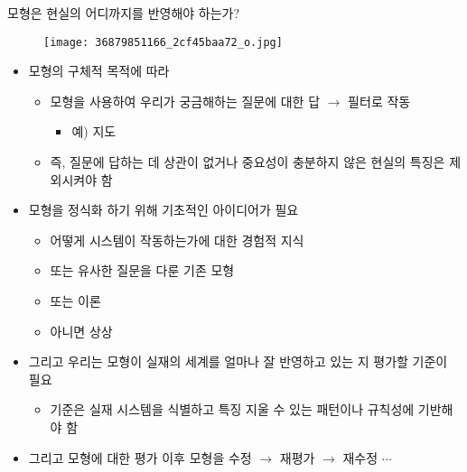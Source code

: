 \documentclass[hyperref={unicode}]{beamer}
\begin{document}
\begin{frame}{모형은 현실의 어디까지를 반영해야 하는가?}
	\begin{figure}[ht]
		\texttt{[image: 36879851166\_2cf45baa72\_o.jpg]}
		\label{fig:model}
	\end{figure}
\end{frame}

\begin{frame}
\begin{itemize}
\item 모형의 구체적 목적에 따라
	\begin{itemize}
	\item 모형을 사용하여 우리가 궁금해하는 질문에 대한 답 $\rightarrow$ 필터로 작동
		\begin{itemize}
		\item 예) 지도
		\end{itemize}
	\item 즉, 질문에 답하는 데 상관이 없거나 중요성이 충분하지 않은 현실의 특징은 제외시켜야 함
	\end{itemize}
\end{itemize}
\end{frame}

\begin{frame}
\begin{itemize}
\item 모형을 정식화 하기 위해 기초적인 아이디어가 필요
	\begin{itemize}
	\item 어떻게 시스템이 작동하는가에 대한 경험적 지식
	\item 또는 유사한 질문을 다룬 기존 모형
	\item 또는 이론
	\item 아니면 상상
	\end{itemize}
\item 그리고 우리는 모형이 실재의 세계를 얼마나 잘 반영하고 있는 지 평가할 기준이 필요
	\begin{itemize}
	\item 기준은 실재 시스템을 식별하고 특징 지울 수 있는 패턴이나 규칙성에 기반해야 함
	\end{itemize}
\item 그리고 모형에 대한 평가 이후 모형을 수정 $\rightarrow$ 재평가 $\rightarrow$ 재수정 $\cdots$
\end{itemize}	
\end{frame}
\end{document}
